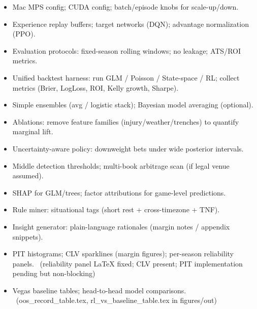 \begin{itemize}
  \item {} Mac MPS config; CUDA config; batch/episode knobs for scale-up/down.
  \item {} Experience replay buffers; target networks (DQN); advantage normalization (PPO).
  \item {} Evaluation protocols: fixed-season rolling windows; no leakage; ATS/ROI metrics.
\end{itemize}

\begin{itemize}
  \item {} Unified backtest harness: run GLM / Poisson / State-space / RL; collect metrics (Brier, LogLoss, ROI, Kelly growth, Sharpe).
  \item {} Simple ensembles (avg / logistic stack); Bayesian model averaging (optional).
  \item {} Ablations: remove feature families (injury/weather/trenches) to quantify marginal lift.
\end{itemize}

\begin{itemize}
  \item {} Uncertainty-aware policy: downweight bets under wide posterior intervals.
\end{itemize}

\begin{itemize}
  \item {} Middle detection thresholds; multi-book arbitrage scan (if legal venue assumed).
\end{itemize}

\begin{itemize}
  \item {} SHAP for GLM/trees; factor attributions for game-level predictions.
  \item {} Rule miner: situational tags (short rest + cross-timezone + TNF).
  \item {} Insight generator: plain-language rationales (margin notes / appendix snippets).
\end{itemize}

\begin{itemize}
  \item {} PIT histograms; CLV sparklines (margin figures); per-season reliability panels. \done\ (reliability panel LaTeX fixed; CLV present; PIT implementation pending but non-blocking)
  \item {} Vegas baseline tables; head-to-head model comparisons. \done\ (oos\_record\_table.tex, rl\_vs\_baseline\_table.tex in figures/out)
\end{itemize}

